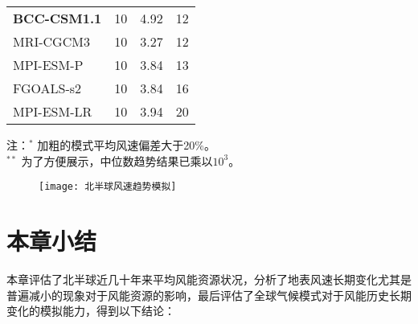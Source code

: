 \begin{table}[!t]
    \ContinuedFloat%
    \label{tab:descriptionGCM2}
    \centering
    \small%
    \setlength{\tabcolsep}{27 pt}%
    \renewcommand{\arraystretch}{1.0}%
     \begin{tabular}{llll}
        \hline 
        \textbf{BCC-CSM1.1} & 10 & 4.92 & 12 \\
        MRI-CGCM3 & 10 & 3.27 & 12 \\
        MPI-ESM-P & 10 & 3.84 & 13 \\
        FGOALS-s2 & 10 & 3.84 & 16 \\
        MPI-ESM-LR & 10 & 3.94 & 20 \\
        \hline
      \end{tabular}
      
      \vspace*{3ex}  
      
    \begin{minipage}{0.8\textwidth}%
    注：$^*$ 加粗的模式平均风速偏差大于20\%。\\ 
    $^{**}$ 为了方便展示，中位数趋势结果已乘以$10^3$。
    \end{minipage}
\end{table}

\begin{figure}[!b]
    \centering
     \texttt{[image: 北半球风速趋势模拟]}
    \label{fig:GCMwind}
\end{figure}

\section{本章小结}

本章评估了北半球近几十年来平均风能资源状况，分析了地表风速长期变化尤其是普遍减小的现象对于风能资源的影响，最后评估了全球气候模式对于风能历史长期变化的模拟能力，得到以下结论：

